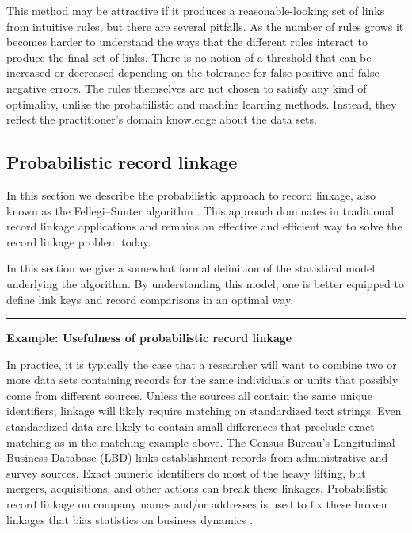 \documentclass[]{krantz}
\begin{document}
This method may be attractive if it produces a reasonable-looking set of
links from intuitive rules, but there are several pitfalls. As the
number of rules grows it becomes harder to understand the ways that the
different rules interact to produce the final set of links. There is no
notion of a threshold that can be increased or decreased depending on
the tolerance for false positive and false negative errors. The rules
themselves are not chosen to satisfy any kind of optimality, unlike the
probabilistic and machine learning methods. Instead, they reflect the
practitioner's domain knowledge about the data sets.

\subsection{Probabilistic record
linkage}\label{probabilistic-record-linkage}

In this section we describe the probabilistic approach to record
linkage, also known as the Fellegi--Sunter algorithm \citep{FS69}. This
approach dominates in traditional record linkage applications and
remains an effective and efficient way to solve the record linkage
problem today.

In this section we give a somewhat formal definition of the statistical
model underlying the algorithm. By understanding this model, one is
better equipped to define link keys and record comparisons in an optimal
way.

\begin{center}\rule{0.5\linewidth}{\linethickness}\end{center}

\textbf{Example: Usefulness of probabilistic record linkage}

In practice, it is typically the case that a researcher will want to
combine two or more data sets containing records for the same
individuals or units that possibly come from different sources. Unless
the sources all contain the same unique identifiers, linkage will likely
require matching on standardized text strings. Even standardized data
are likely to contain small differences that preclude exact matching as
in the matching example above. The Census Bureau's Longitudinal Business
Database (LBD) links establishment records from administrative and
survey sources. Exact numeric identifiers do most of the heavy lifting,
but mergers, acquisitions, and other actions can break these linkages.
Probabilistic record linkage on company names and/or addresses is used
to fix these broken linkages that bias statistics on business dynamics
\citep{jarmin2002longitudinal}.
\end{document}
